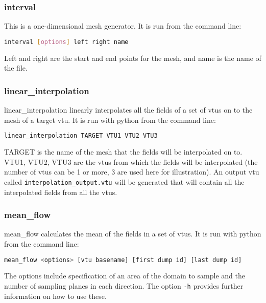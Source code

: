 
\subsubsection{interval}
\label{sect:interval}

This is a one-dimensional mesh generator. It is run from the command line:
\begin{lstlisting}[language = Bash]
interval [options] left right name 
\end{lstlisting}
Left and right are the start and end points for the mesh, and name is the name of the file.


\subsubsection{linear\_interpolation}
\label{sect:scripts_linear_interpolation}
linear\_interpolation linearly interpolates all the fields of a set of vtus on to the mesh of a target vtu. It is run with python from the command line:
\begin{lstlisting}[language = Bash]
linear_interpolation TARGET VTU1 VTU2 VTU3 
\end{lstlisting}
TARGET is the name of the mesh that the fields will be interpolated on to. VTU1, VTU2, VTU3 are the vtus from which the fields will be interpolated (the number of vtus can be 1 or more, 3 are used here for illustration). An output vtu called \lstinline[language = Bash]+interpolation_output.vtu+ will be generated that will contain all the interpolated fields from all the vtus. 

 
\subsubsection{mean\_flow}
\label{sect:mean_flow}

mean\_flow calculates the mean of the fields in a set of vtus. It is run with python from the command line:
\begin{lstlisting}[language = Bash]
mean_flow <options> [vtu basename] [first dump id] [last dump id]
\end{lstlisting}
The options include specification of an area of the domain to sample and the number of sampling planes in each direction. The option \lstinline[language = Bash]+-h+ provides further information on how to use these.

